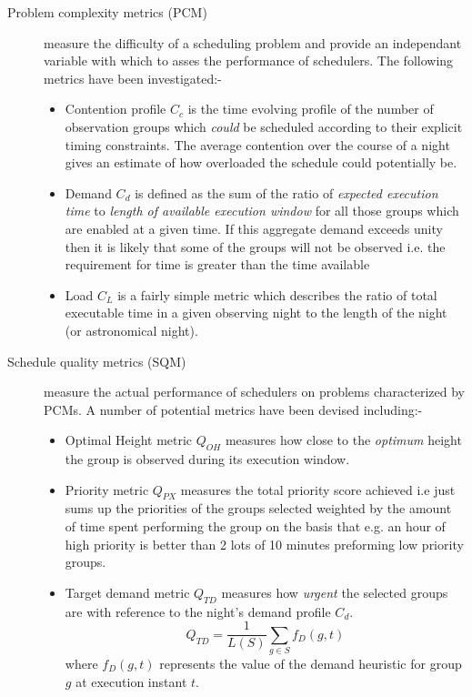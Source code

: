 \documentclass[12pt,a4paper]{article}
\begin{document}
\begin{description}
\item[Problem complexity metrics (PCM)] measure the difficulty of a scheduling problem and provide an independant variable with which to asses the performance of schedulers. The following metrics have been investigated:-

\begin{itemize} 
\item Contention profile $C_c$ is the time evolving profile of the number of observation groups which \emph{could} be scheduled according to their explicit timing constraints. The average contention over the course of a night gives an estimate of how overloaded the schedule could potentially be.

\item Demand $C_d$ is defined as the sum of the ratio of \emph{expected execution time} to \emph{length of available execution window} for all those groups which are enabled at a given time. If this aggregate demand exceeds unity then it is likely that some of the groups will not be observed i.e. the requirement for time is greater than the time available

\item Load $C_L$ is a fairly simple metric which describes the ratio of total executable time in a given observing night to the length of the night (or astronomical night).

\end{itemize}
\item[Schedule quality metrics (SQM)] measure the actual performance of schedulers on problems characterized by PCMs. A number of potential  metrics have been devised including:-

\begin{itemize}

\item Optimal Height metric $Q_{OH}$ measures how close to the \emph{optimum} height the group is observed during its execution window. 

\item Priority metric $Q_{PX}$ measures the total priority score achieved i.e just sums up the priorities of the groups selected weighted by the amount of time spent performing the group on the basis that e.g. an hour of high priority is better than 2 lots of 10 minutes preforming low priority groups. 

\item Target demand metric $Q_{TD}$ measures how \emph{urgent} the selected groups are with reference to the night's demand profile $C_d$.
\begin{equation}
Q_{TD} = \frac{1}{L(S)}\sum_{g \in S}{f_D(g,t)}
\end{equation}
where $f_D(g,t)$ represents the value of the demand heuristic for group $g$ at execution instant $t$.


\end{itemize}
\end{description}
\end{document}

